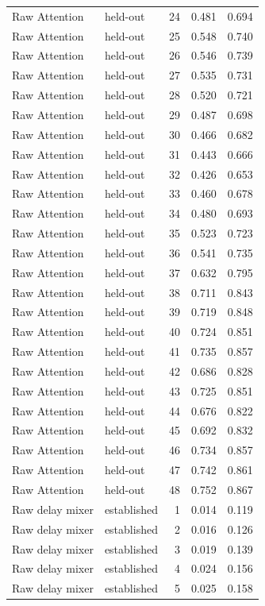 \begin{tabular}{llrrr}
Raw Attention & held-out & 24 & 0.481 & 0.694 \\
Raw Attention & held-out & 25 & 0.548 & 0.740 \\
Raw Attention & held-out & 26 & 0.546 & 0.739 \\
Raw Attention & held-out & 27 & 0.535 & 0.731 \\
Raw Attention & held-out & 28 & 0.520 & 0.721 \\
Raw Attention & held-out & 29 & 0.487 & 0.698 \\
Raw Attention & held-out & 30 & 0.466 & 0.682 \\
Raw Attention & held-out & 31 & 0.443 & 0.666 \\
Raw Attention & held-out & 32 & 0.426 & 0.653 \\
Raw Attention & held-out & 33 & 0.460 & 0.678 \\
Raw Attention & held-out & 34 & 0.480 & 0.693 \\
Raw Attention & held-out & 35 & 0.523 & 0.723 \\
Raw Attention & held-out & 36 & 0.541 & 0.735 \\
Raw Attention & held-out & 37 & 0.632 & 0.795 \\
Raw Attention & held-out & 38 & 0.711 & 0.843 \\
Raw Attention & held-out & 39 & 0.719 & 0.848 \\
Raw Attention & held-out & 40 & 0.724 & 0.851 \\
Raw Attention & held-out & 41 & 0.735 & 0.857 \\
Raw Attention & held-out & 42 & 0.686 & 0.828 \\
Raw Attention & held-out & 43 & 0.725 & 0.851 \\
Raw Attention & held-out & 44 & 0.676 & 0.822 \\
Raw Attention & held-out & 45 & 0.692 & 0.832 \\
Raw Attention & held-out & 46 & 0.734 & 0.857 \\
Raw Attention & held-out & 47 & 0.742 & 0.861 \\
Raw Attention & held-out & 48 & 0.752 & 0.867 \\
Raw delay mixer & established & 1 & 0.014 & 0.119 \\
Raw delay mixer & established & 2 & 0.016 & 0.126 \\
Raw delay mixer & established & 3 & 0.019 & 0.139 \\
Raw delay mixer & established & 4 & 0.024 & 0.156 \\
Raw delay mixer & established & 5 & 0.025 & 0.158 \\

\end{tabular}
